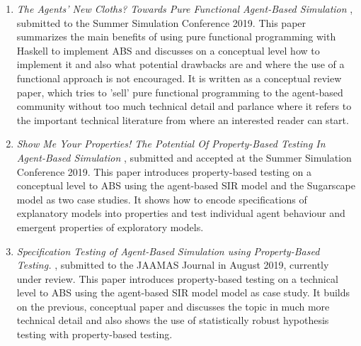 \begin{enumerate}
	\item \textit{The Agents' New Cloths? Towards Pure Functional Agent-Based Simulation} \cite{thaler_agents_2019}, submitted to the Summer Simulation Conference 2019. This paper summarizes the main benefits of using pure functional programming with Haskell to implement ABS and discusses on a conceptual level how to implement it and also what potential drawbacks are and where the use of a functional approach is not encouraged. It is written as a conceptual review paper, which tries to 'sell' pure functional programming to the agent-based community without too much technical detail and parlance where it refers to the important technical literature from where an interested reader can start.
	
	\item \textit{Show Me Your Properties! The Potential Of Property-Based Testing In Agent-Based Simulation} \cite{thaler_show_2019}, submitted and accepted at the Summer Simulation Conference 2019. This paper introduces property-based testing on a conceptual level to ABS using the agent-based SIR model and the Sugarscape model as two case studies. It shows how to encode specifications of explanatory models into properties and test individual agent behaviour and emergent properties of exploratory models.
	
	\item \textit{Specification Testing of Agent-Based Simulation using Property-Based Testing.} \cite{thaler_specification_2019}, submitted to the JAAMAS Journal in August 2019, currently under review.
This paper introduces property-based testing on a technical level to ABS using the agent-based SIR model model as case study. It builds on the previous, conceptual paper and discusses the topic in much more technical detail and also shows the use of statistically robust hypothesis testing with property-based testing.
\end{enumerate}